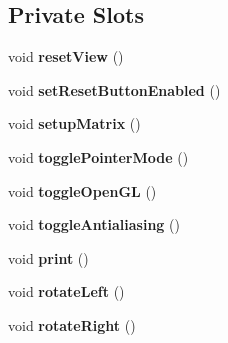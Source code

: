 \subsection*{Private Slots}
\begin{DoxyCompactItemize}
\item 
\mbox{\label{class_view_ad401cfb19dd4800f421462f9ac06dcb1}} 
void {\bfseries reset\+View} ()
\item 
\mbox{\label{class_view_a8f5452cd1fadff1f76451043805ab0c8}} 
void {\bfseries set\+Reset\+Button\+Enabled} ()
\item 
\mbox{\label{class_view_a50cdd507f48026272dbb2293c5f8d668}} 
void {\bfseries setup\+Matrix} ()
\item 
\mbox{\label{class_view_ab3077023f0e3869424f2b18e2ad59a2e}} 
void {\bfseries toggle\+Pointer\+Mode} ()
\item 
\mbox{\label{class_view_a5d0cdedad1872f6fbc1301bc199d9542}} 
void {\bfseries toggle\+Open\+GL} ()
\item 
\mbox{\label{class_view_a3abbaa118728a17554556b248e99ac08}} 
void {\bfseries toggle\+Antialiasing} ()
\item 
\mbox{\label{class_view_a699105aa4ef8bd0709654056de54f074}} 
void {\bfseries print} ()
\item 
\mbox{\label{class_view_a978048b2af8e37726bec40c04bd0eac9}} 
void {\bfseries rotate\+Left} ()
\item 
\mbox{\label{class_view_ae5d1a85e57efa86cf6017c3da3e27db5}} 
void {\bfseries rotate\+Right} ()
\end{DoxyCompactItemize}

